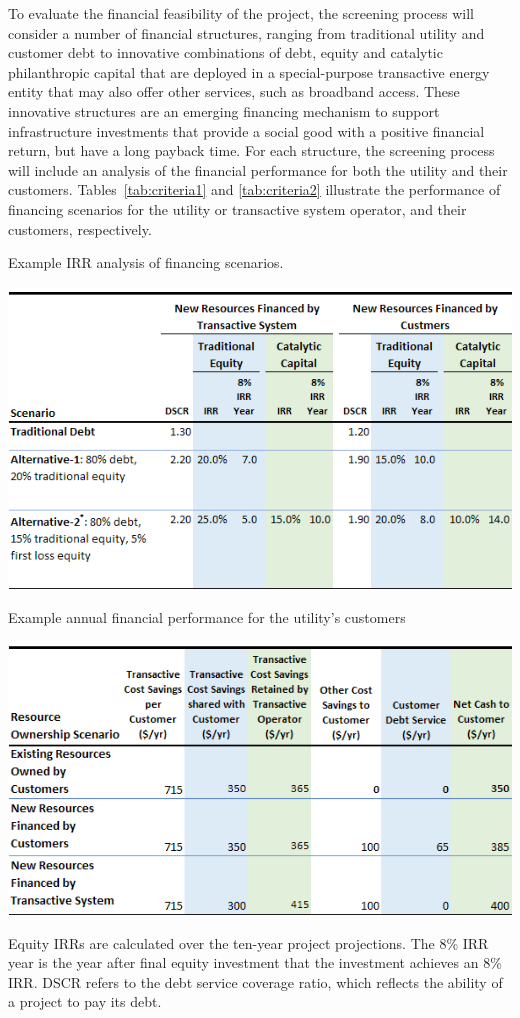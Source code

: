 \documentclass[10pt,twocolumn]{article}
\begin{document}
To evaluate the financial feasibility of the project, the screening process will consider a number of financial structures, ranging from traditional utility and customer debt to innovative combinations of debt, equity and catalytic philanthropic capital that are deployed in a special-purpose transactive energy entity that may also offer other services, such as broadband access. These innovative structures are an emerging financing mechanism to support infrastructure investments that provide a social good with a positive financial return, but have a long payback time. For each structure, the screening process will include an analysis of the financial performance for both the utility and their customers. Tables~\ref{tab:criteria1} and \ref{tab:criteria2} illustrate the performance of financing scenarios for the utility or transactive system operator, and their customers, respectively.  
\begin{table}[!t]
    \centering
    \caption{Example IRR analysis of financing scenarios.}
    \label{tab:criteria1}
    \includegraphics[width=\columnwidth]{tess_table_2.png}
\end{table}
\begin{table}[!t]
    \centering
    \caption{Example annual financial performance for the utility's customers}
    \label{tab:criteria2}
    \includegraphics[width=\columnwidth]{tess_table_3.png}
\end{table}
Equity IRRs are calculated over the ten-year project projections.  The 8\% IRR year is the year after final equity investment that the investment achieves an 8\% IRR. DSCR refers to the debt service coverage ratio, which reflects the ability of a project to pay its debt.
\end{document}
